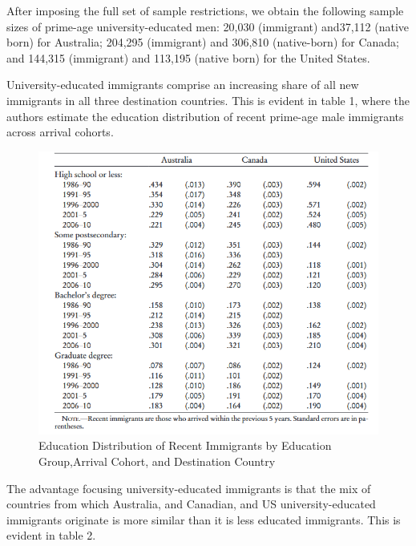 \documentclass[../root]{subfiles}
\begin{document}
    After imposing the full set of sample restrictions, we obtain the following sample sizes of prime-age university-educated men: 20,030 (immigrant) and37,112 (native born) for Australia; 204,295 (immigrant) and 306,810 (native-born) for Canada; and 144,315 (immigrant) and 113,195 (native born) for the United States. 
    
    University-educated immigrants comprise an increasing share of all new immigrants in all three destination countries. 
    This is evident in table 1, where the authors estimate the education distribution of recent prime-age male immigrants across arrival cohorts.
    
    \begin{figure}
        \centering
        \includegraphics[width = \linewidth]{0828sugiyama/Table_1.png}
        \caption{ Education Distribution of Recent Immigrants by Education Group,Arrival Cohort, and Destination Country}
        \label{fig:my_label}
    \end{figure}
    
    The advantage focusing university-educated immigrants is that the mix of countries from which Australia, and Canadian, and US university-educated immigrants originate is more similar than it is less educated immigrants. This is evident in table 2.
    
\end{document}
